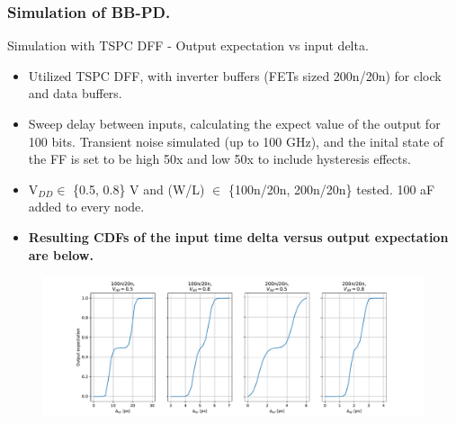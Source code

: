 \documentclass[t, screen, aspectratio=43]{beamer}
\begin{document}
\begin{frame}
	\frametitle{Simulation of BB-PD.}
	\begin{block}{Simulation with TSPC DFF - Output expectation vs input delta.}
	\tiny
	\begin{itemize}[itemsep=4pt,label=\protect---]
		\item Utilized TSPC DFF, with inverter buffers (FETs sized 200n/20n) for clock and data buffers.
		\item Sweep delay between inputs, calculating the expect value of the output for 100 bits. Transient noise simulated (up to 100 GHz), and the inital state of the FF is set to be high 50x and low 50x to include hysteresis effects. 
		\item V$_{DD} \in$ \{0.5, 0.8\} V and (W/L) $\in$ \{100n/20n, 200n/20n\} tested. 100 aF added to every node.
		\item \textbf{Resulting CDFs of the input time delta versus output expectation are below.}
	\end{itemize}
	\vspace{-2em}
	\begin{figure}[htb!]
	    \centering
		\includegraphics[width=1\textwidth, angle=0]{cdfs.pdf}
	\end{figure}
	\end{block}	
\end{frame}
\end{document}
